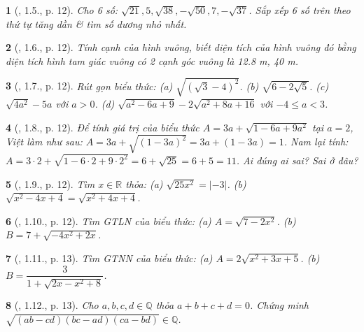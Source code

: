 \documentclass{article}
\newtheorem{baitoan}{}%
\begin{document}
\begin{baitoan}[\cite{Binh_boi_duong_Toan_9_tap_1}, 1.5., p. 12]
	Cho 6 số: $\sqrt{21},5,\sqrt{38},-\sqrt{50},7,-\sqrt{37}$. Sắp xếp 6 số trên theo thứ tự tăng dần \& tìm số dương nhỏ nhất.
\end{baitoan}

\begin{baitoan}[\cite{Binh_boi_duong_Toan_9_tap_1}, 1.6., p. 12]
	Tính cạnh của hình vuông, biết diện tích của hình vuông đó bằng diện tích hình tam giác vuông có 2 cạnh góc vuông là {\rm12.8 m, 40 m}.
\end{baitoan}

\begin{baitoan}[\cite{Binh_boi_duong_Toan_9_tap_1}, 1.7., p. 12]
	Rút gọn biểu thức: (a) $\sqrt{(\sqrt{3} - 4)^2}$. (b) $\sqrt{6 - 2\sqrt{5}}$. (c) $\sqrt{4a^2} - 5a$ với $a > 0$. (d) $\sqrt{a^2 - 6a + 9} - 2\sqrt{a^2 + 8a + 16}$ với $-4\le a < 3$.
\end{baitoan}

\begin{baitoan}[\cite{Binh_boi_duong_Toan_9_tap_1}, 1.8., p. 12]
	Để tính giá trị của biểu thức $A = 3a + \sqrt{1 - 6a + 9a^2}$ tại $a = 2$, Việt làm như sau: $A = 3a + \sqrt{(1 - 3a)^2} = 3a + (1 - 3a) = 1$. Nam lại tính: $A = 3\cdot2 + \sqrt{1 - 6\cdot2 + 9\cdot2^2} = 6 + \sqrt{25} = 6 + 5 = 11$. Ai đúng ai sai? Sai ở đâu?
\end{baitoan}

\begin{baitoan}[\cite{Binh_boi_duong_Toan_9_tap_1}, 1.9., p. 12]
	Tìm $x\in\mathbb{R}$ thỏa: (a) $\sqrt{25x^2} = |-3|$. (b) $\sqrt{x^2 - 4x + 4} = \sqrt{x^2 + 4x + 4}$.
\end{baitoan}

\begin{baitoan}[\cite{Binh_boi_duong_Toan_9_tap_1}, 1.10., p. 12]
	Tìm {\rm GTLN} của biểu thức: (a) $A = \sqrt{7 - 2x^2}$. (b) $B = 7 + \sqrt{-4x^2 + 2x}$.
\end{baitoan}

\begin{baitoan}[\cite{Binh_boi_duong_Toan_9_tap_1}, 1.11., p. 13]
	Tìm {\rm GTNN} của biểu thức: (a) $A = 2\sqrt{x^2 + 3x + 5}$. (b) $B = \dfrac{3}{1 + \sqrt{2x - x^2 + 8}}$.
\end{baitoan}

\begin{baitoan}[\cite{Binh_boi_duong_Toan_9_tap_1}, 1.12., p. 13]
	Cho $a,b,c,d\in\mathbb{Q}$ thỏa $a + b + c + d = 0$. Chứng minh $\sqrt{(ab - cd)(bc - ad)(ca - bd)}\in\mathbb{Q}$.
\end{baitoan}
\end{document}
